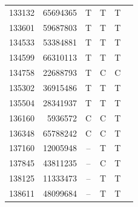 \begin{table}[htbp]
\begin{tabular}{rr ccc l}
133132 & 65694365 & T & T & T & \\
133601 & 59687803 & T & T & T & \\
134533 & 53384881 & T & T & T & \\
134599 & 66310113 & T & T & T & \\
134758 & 22688793 & T & C & C & \\
135302 & 36915486 & T & T & T & \\
135504 & 28341937 & T & T & T & \\
136160 & 5936572 & C & C & T & \\
136348 & 65788242 & C & C & T & \\
137160 & 12005948 & -- & T & T & \\
137845 & 43811235 & -- & C & T & \\
138125 & 11333473 & -- & T & T & \\
138611 & 48099684 & -- & T & T & \\
\bottomrule
\end{tabular}
\end{table}
